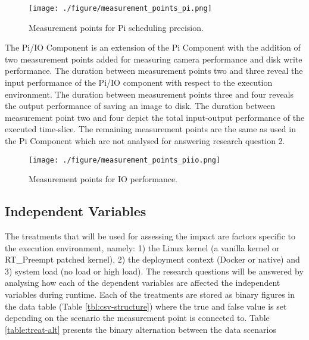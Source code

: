 \begin{figure}[ht]
\centering
     \texttt{[image: ./figure/measurement\_points\_pi.png]}
      \caption{Measurement points for Pi scheduling precision.}
       \label{pi_measure}
\end{figure}

The Pi/IO Component is an extension of the Pi Component with the addition of two measurement points added for measuring camera performance and disk write performance. The duration between measurement points two and three reveal the input performance of the Pi/IO component with respect to the execution environment. The duration between measurement points three and four reveals the output performance of saving an image to disk. The duration between measurement point two and four depict the total input-output performance of the executed time-slice. The remaining measurement points are the same as used in the Pi Component which are not analysed for answering research question 2.



\begin{figure}[ht]
\centering
     \texttt{[image: ./figure/measurement\_points\_piio.png]}
      \caption{Measurement points for IO performance.}
       \label{piio_measure}
\end{figure}


\subsection{Independent Variables} \label{section:independent}
The treatments that will be used for assessing the impact are factors specific to the execution environment, namely: 1) the Linux kernel (a vanilla kernel or RT\_Preempt patched kernel), 2) the deployment context (Docker or native) and 3) system load (no load or high load). The research questions will be answered by analysing how each of the dependent variables are affected the independent variables during runtime. Each of the treatments are stored as binary figures in the data table (Table \ref{tbl:csv-structure}) where the true and false value is set depending on the scenario the measurement point is connected to. Table \ref{table:treat-alt} presents the binary alternation between the data scenarios

